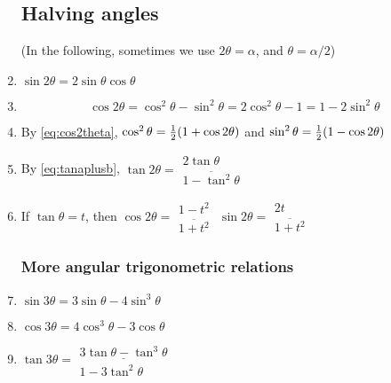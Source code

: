 \documentclass[a4paper]{article}
\begin{document}
\begin{enumerate}
\subsection{Halving angles}

(In the following, sometimes we use $2\theta = \alpha$, and $\theta=\alpha/2$)

\item
$\sin 2\theta = 2\sin\theta \cos\theta$

\item
\begin{equation}\label{eq:cos2theta}
\cos 2\theta = \cos^2\theta - \sin^2 \theta = 2\cos^2 \theta - 1 = 1 - 2\sin^2\theta
\end{equation}

\item
By \ref{eq:cos2theta},
$\cos^2 \theta = \frac{1}{2} (1+ \cos 2\theta)$
and
$\sin^2 \theta = \frac{1}{2} (1- \cos 2\theta)$

\item
By \ref{eq:tanaplusb},
$\tan 2 \theta = 
\begin{array}{c}
2 \tan \theta \\
\overline{  1-  \tan^2 \theta}
\end{array}
$

\item
If $\tan \theta = t$, then
$\cos 2\theta = 
\begin{array}{c}
1-t^2 \\
\overline{1+t^2}
\end{array}$
\qquad
$\sin 2\theta = 
\begin{array}{c}
2t \\
\overline{1+t^2}
\end{array}$

\subsubsection{More angular trigonometric relations}

\item
$\sin 3\theta = 3\sin\theta - 4 \sin^3\theta$

\item
$\cos 3\theta = 4\cos^3 \theta - 3\cos \theta$

\item
$\tan 3 \theta = \begin{array}{c}
\underline{3\tan\theta - \tan ^3\theta} \\
1-3\tan^2\theta
\end{array}$


\end{enumerate}
\end{document}

